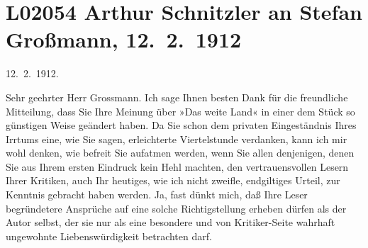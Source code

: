 

\section[Arthur Schnitzler an Stefan Großmann, 12. 2. 1912]{L02054 Arthur Schnitzler an Stefan Großmann, 12. 2. 1912}
\nopagebreak{}
\rehead{ }\normalsize\beginnumbering{}
\toendnotes[C]{\smallbreak\pagebreak[2]}
\toendnotes[C]{\smallbreak}
\pstart
           \raggedleft{}{\pb}12. 2. 1912.\pend
           
\pstart{}Sehr geehrter Herr Grossmann.\pend\vspace{0.5em}
\pstart
           Ich sage Ihnen besten Dank für die freundliche Mitteilung, dass Sie Ihre Meinung über
                  »Das weite Land« in einer dem Stück so
               günstigen Weise geändert haben. Da Sie schon dem privaten Eingeständnis Ihres Irrtums
               eine, wie Sie sagen, erleichterte Viertelstunde verdanken, kann ich mir wohl denken,
               wie befreit Sie aufatmen werden, wenn Sie allen denjenigen, {\pb}denen Sie aus Ihrem
               ersten Eindruck kein Hehl machten, den vertrauensvollen Lesern Ihrer Kritiken, auch
               Ihr heutiges, wie ich nicht zweifle, endgiltiges Urteil, zur Kenntnis gebracht haben
               werden. Ja, fast dünkt mich, daß Ihre Leser begründetere Ansprüche auf eine solche
               Richtigstellung erheben dürfen als der Autor selbst, der sie nur als eine besondere
               und von Kritiker-Seite wahrhaft ungewohnte Liebenswürdigkeit betrachten darf.\pend
           
